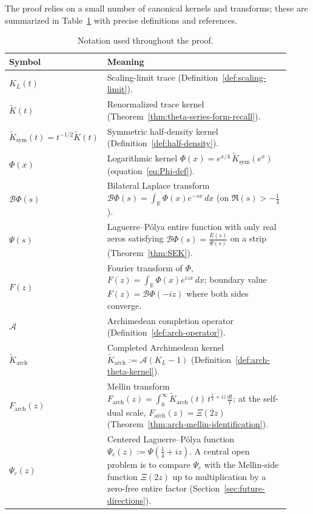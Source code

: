 \documentclass[12pt]{amsart}
\theoremstyle{definition}
\theoremstyle{remark}
\newcommand{\R}{\mathbb{R}}
\begin{document}
The proof relies on a small number of canonical kernels and transforms; these are summarized in Table~\ref{tab:notation} with precise definitions and references.

\begin{table}[h!]
\centering
\setlength{\arrayrulewidth}{0.8pt}
\renewcommand{\arraystretch}{1.25}

\begin{tabular}{|p{0.22\linewidth}|p{0.70\linewidth}|}
\hline
\textbf{Symbol} & \textbf{Meaning} \\
\hline
$K_L(t)$ &
Scaling-limit trace
(Definition~\ref{def:scaling-limit}).
\\ \hline
$\widetilde K(t)$ &
Renormalized trace kernel
(Theorem~\ref{thm:theta-series-form-recall}).
\\ \hline
$\widetilde K_{\mathrm{sym}}(t)=t^{-1/2}\widetilde K(t)$ &
Symmetric half-density kernel
(Definition~\ref{def:half-density}).
\\ \hline
$\Phi(x)$ &
Logarithmic kernel
$\Phi(x)=e^{x/4}\,\widetilde K_{\mathrm{sym}}(e^x)$
(equation~\eqref{eq:Phi-def}).
\\ \hline
$\mathcal B\Phi(s)$ &
Bilateral Laplace transform
$\displaystyle \mathcal B\Phi(s)=\int_{\R}\Phi(x)e^{-s x}\,dx$
(on $\Re(s)>-\tfrac14$).
\\ \hline
$\Psi(s)$ &
Laguerre--P\'olya entire function with only real zeros satisfying
$\mathcal B\Phi(s)=\frac{E(s)}{\Psi(s)}$ on a strip
(Theorem~\ref{thm:SEK}).
\\ \hline
$F(z)$ &
Fourier transform of $\Phi$,
$\displaystyle F(z)=\int_{\R}\Phi(x)e^{izx}\,dx$;
boundary value $F(z)=\mathcal B\Phi(-iz)$ where both sides converge.
\\ \hline
$\mathcal A$ &
Archimedean completion operator
(Definition~\ref{def:arch-operator}).
\\ \hline
$\widetilde K_{\mathrm{arch}}$ &
Completed Archimedean kernel
$\widetilde K_{\mathrm{arch}}:=\mathcal A(K_L-1)$
(Definition~\ref{def:arch-theta-kernel}).
\\ \hline
$F_{\mathrm{arch}}(z)$ &
Mellin transform
$\displaystyle F_{\mathrm{arch}}(z)=\int_0^{\infty}
\widetilde K_{\mathrm{arch}}(t)\,
t^{\frac14+iz}\frac{dt}{t}$;
at the self-dual scale,
$F_{\mathrm{arch}}(z)=\Xi(2z)$
(Theorem~\ref{thm:arch-mellin-identification}).
\\ \hline
$\Psi_c(z)$ &
Centered Laguerre--P\'olya function
$\Psi_c(z):=\Psi(\tfrac14+iz)$. A central open problem is to compare $\Psi_c$ with the Mellin-side
function $\Xi(2z)$ up to multiplication by a zero-free entire factor (Section~\ref{sec:future-directions}).
\\ \hline
\end{tabular}

\caption{Notation used throughout the proof.}
\label{tab:notation}
\end{table}
\end{document}
